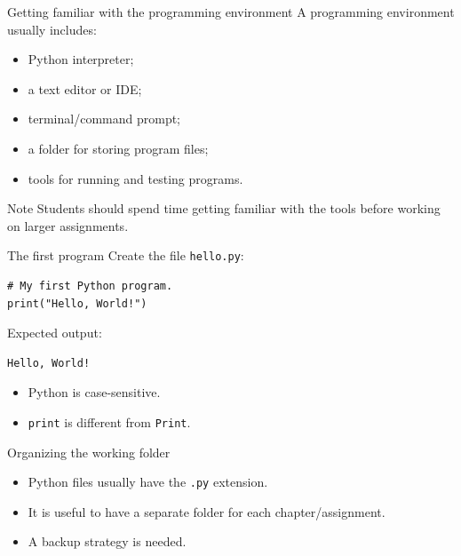 \documentclass[aspectratio=169,10pt]{beamer}
\begin{document}
\begin{frame}{Getting familiar with the programming environment}
A programming environment usually includes:
\begin{itemize}
  \item Python interpreter;
  \item a text editor or IDE;
  \item terminal/command prompt;
  \item a folder for storing program files;
  \item tools for running and testing programs.
\end{itemize}

\begin{alertblock}{Note}
Students should spend time getting familiar with the tools before working on larger assignments.
\end{alertblock}
\end{frame}

\begin{frame}[fragile]{The first program}
Create the file \texttt{hello.py}:

\begin{lstlisting}
# My first Python program.
print("Hello, World!")
\end{lstlisting}

Expected output:

\begin{lstlisting}
Hello, World!
\end{lstlisting}

\begin{itemize}
  \item Python is case-sensitive.
  \item \texttt{print} is different from \texttt{Print}.
\end{itemize}
\end{frame}

\begin{frame}{Organizing the working folder}
\begin{center}
\end{center}

\begin{itemize}
  \item Python files usually have the \texttt{.py} extension.
  \item It is useful to have a separate folder for each chapter/assignment.
  \item A backup strategy is needed.
\end{itemize}
\end{frame}
\end{document}
